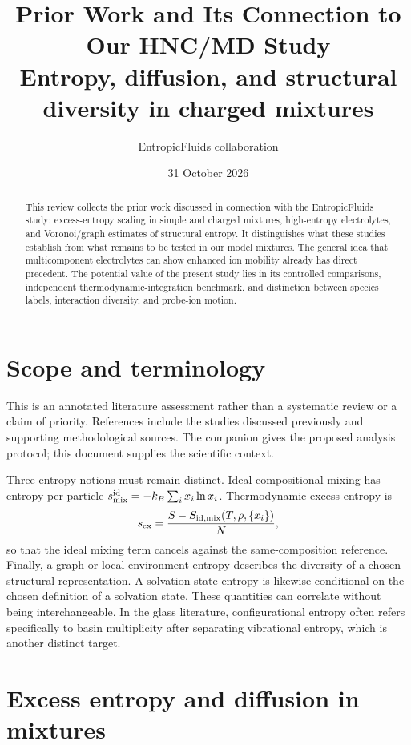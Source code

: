 \documentclass[11pt,a4paper]{article}
\title{Prior Work and Its Connection to Our HNC/MD Study\\
\large Entropy, diffusion, and structural diversity in charged mixtures}
\author{EntropicFluids collaboration}
\date{31 October 2026}
\begin{document}
\maketitle
\begin{abstract}
This review collects the prior work discussed in connection with the
EntropicFluids study: excess-entropy scaling in simple and charged mixtures,
high-entropy electrolytes, and Voronoi/graph estimates of structural entropy.
It distinguishes what these studies establish from what remains to be tested
in our model mixtures. The general idea that multicomponent electrolytes can
show enhanced ion mobility already has direct precedent. The potential value
of the present study lies in its controlled comparisons, independent
thermodynamic-integration benchmark, and distinction between species labels,
interaction diversity, and probe-ion motion.
\end{abstract}

\section{Scope and terminology}
This is an annotated literature assessment rather than a systematic review
or a claim of priority. References include the studies discussed previously
and supporting methodological sources. The companion
 gives the proposed analysis protocol;
this document supplies the scientific context.

Three entropy notions must remain distinct. Ideal compositional mixing has
entropy per particle $s_{\rm mix}^{\rm id}=-k_B\sum_i x_i\ln x_i$.
Thermodynamic excess entropy is
\begin{equation}
s_{\rm ex}=\frac{S-S_{\rm id,mix}(T,\rho,\{x_i\})}{N},
\end{equation}
so that the ideal mixing term cancels against the same-composition reference.
Finally, a graph or local-environment entropy describes the diversity of a
chosen structural representation. A solvation-state entropy is likewise
conditional on the chosen definition of a solvation state. These quantities
can correlate without being interchangeable. In the glass literature,
configurational entropy often refers specifically to basin multiplicity
after separating vibrational entropy, which is another distinct target.

\section{Excess entropy and diffusion in mixtures}
\end{document}
